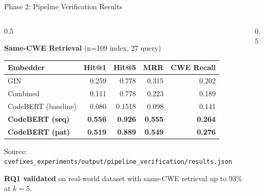 \documentclass[aspectratio=169,10pt]{beamer}
\newcommand{\cmiss}[1]{\cellcolor{miss!25} #1}
\begin{document}
\begin{frame}{Phase 2: Pipeline Verification Results}

  \begin{columns}[T]
    \begin{column}{0.5\textwidth}

  \begin{center}
    {\small\textbf{Same-CWE Retrieval} {\scriptsize(n=109 index, 27 query)}}\\[6pt]
  {\scriptsize
  \renewcommand{\arraystretch}{1.35}
  \setlength{\tabcolsep}{3.5pt}
    \begin{tabular}{lrrrr}
      \toprule
      \textbf{Embedder} & \textbf{Hit@1} & \textbf{Hit@5} & \textbf{MRR} & \textbf{CWE Recall} \\
      \midrule
      GIN & 0.259 & 0.778 & 0.315 & 0.202 \\
      \rowcolor{warn!12}
      Combined & \cmiss{0.111} & 0.778 & 0.223 & 0.189 \\
      CodeBERT (baseline) & 0.080 & 0.1518 & 0.098 & 0.141 \\
      \rowcolor{hit!12}
      \textbf{CodeBERT (seq)} & \textbf{0.556} & \textbf{0.926} & \textbf{0.555} & \textbf{0.264} \\
      \textbf{CodeBERT (pat)} & \textbf{0.519} & \textbf{0.889} & \textbf{0.549} & \textbf{0.276} \\
      \bottomrule
    \end{tabular}
  }

  \vspace{0.3em}
  {\tiny\textcolor{notecol}{Source: \texttt{cvefixes\_experiments/output/pipeline\_verification/results.json}}}

  \vspace{0.3em}
  \begin{tcolorbox}[colback=hit!5, colframe=hit!60!black, boxrule=0.3pt,
    left=3pt, right=2pt, top=2pt, bottom=1pt, arc=2pt, width=0.7\linewidth]
    \scriptsize
    \textbf{RQ1 validated} on real-world dataset with same-CWE retrieval up to 93\% at $k{=}5$.
  \end{tcolorbox}
  
  \end{center}
  
    \end{column}
    \begin{column}{0.5\textwidth}


\end{column}
\end{columns}
\end{frame}
\end{document}
